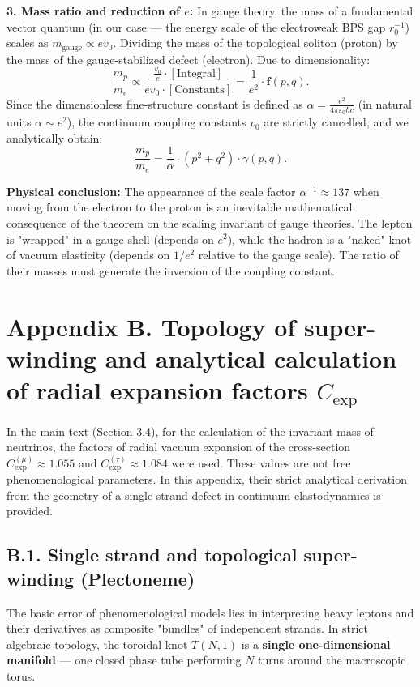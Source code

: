 \documentclass[11pt,a4paper]{article}
\begin{document}
\textbf{3. Mass ratio and reduction of $e$:}
In gauge theory, the mass of a fundamental vector quantum (in our case — the energy scale of the electroweak BPS gap $r_0^{-1}$) scales as $m_{\text{gauge}} \propto e v_0$.
Dividing the mass of the topological soliton (proton) by the mass of the gauge-stabilized defect (electron). Due to dimensionality:
\begin{equation}
	\frac{m_p}{m_e} \propto \frac{\frac{v_0}{e} \cdot [\text{Integral}]}{e v_0 \cdot [\text{Constants}]} = \frac{1}{e^2} \cdot \mathbf{f}(p,q).
\end{equation}
Since the dimensionless fine-structure constant is defined as $\alpha = \frac{e^2}{4\pi\varepsilon_0 \hbar c}$ (in natural units $\alpha \sim e^2$), the continuum coupling constants $v_0$ are strictly cancelled, and we analytically obtain:
\begin{equation}
	\frac{m_p}{m_e} = \frac{1}{\alpha} \cdot (p^2+q^2) \cdot \gamma(p,q).
\end{equation}

\textbf{Physical conclusion:} The appearance of the scale factor $\alpha^{-1} \approx 137$ when moving from the electron to the proton is an inevitable mathematical consequence of the theorem on the scaling invariant of gauge theories. The lepton is "wrapped" in a gauge shell (depends on $e^2$), while the hadron is a "naked" knot of vacuum elasticity (depends on $1/e^2$ relative to the gauge scale). The ratio of their masses must generate the inversion of the coupling constant.

\section*{Appendix B. Topology of super-winding and analytical calculation of radial expansion factors $C_{\text{exp}}$}

In the main text (Section 3.4), for the calculation of the invariant mass of neutrinos, the factors of radial vacuum expansion of the cross-section $C_{\text{exp}}^{(\mu)} \approx 1.055$ and $C_{\text{exp}}^{(\tau)} \approx 1.084$ were used. These values are not free phenomenological parameters. In this appendix, their strict analytical derivation from the geometry of a single strand defect in continuum elastodynamics is provided.

\subsection*{B.1. Single strand and topological super-winding (Plectoneme)}
The basic error of phenomenological models lies in interpreting heavy leptons and their derivatives as composite "bundles" of independent strands. In strict algebraic topology, the toroidal knot $T(N,1)$ is a \textbf{single one-dimensional manifold} — one closed phase tube performing $N$ turns around the macroscopic torus.
\end{document}
